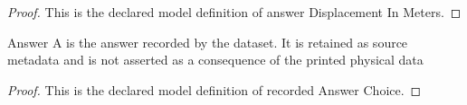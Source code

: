 \begin{proof}
  This is the declared model definition of answer Displacement In Meters.
\end{proof}
\begin{definition}
  \label{def:physics:phyx-mini-0189:phyxminiproblems-problemphyxmini0189-recordedanswerchoice}
  Answer A is the answer recorded by the dataset. It is retained as source metadata and is not asserted as a consequence of the printed physical data
\end{definition}
\begin{proof}
  This is the declared model definition of recorded Answer Choice.
\end{proof}
